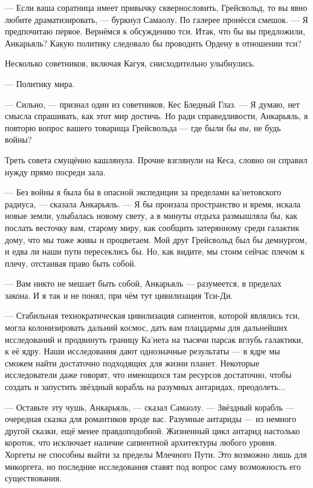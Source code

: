 --- Если ваша соратница имеет привычку сквернословить, Грейсвольд, то вы явно любите драматизировать, --- буркнул Самаолу.
По галерее пронёсся смешок.
--- Я предпочитаю первое.
Вернёмся к обсуждению тси.
Итак, что бы вы предложили, Анкарьяль?
Какую политику следовало бы проводить Ордену в отношении тси?

Несколько советников, включая Кагуя, снисходительно улыбнулись.

--- Политику мира.

--- Сильно, --- признал один из советников, Кес Бледный Глаз.
--- Я думаю, нет смысла спрашивать, как этот мир достичь.
Но ради справедливости, Анкарьяль, я повторю вопрос вашего товарища Грейсвольда --- где были бы \emph{вы}, не будь войны?

Треть совета смущённо кашлянула.
Прочие взглянули на Кеса, словно он справил нужду прямо посреди зала.

--- Без войны я была бы в опасной экспедиции за пределами ка'нетовского радиуса, --- сказала Анкарьяль.
--- Я бы пронзала пространство и время, искала новые земли, улыбалась новому свету, а в минуты отдыха размышляла бы, как послать весточку вам, старому миру, как сообщить затерянному среди галактик дому, что мы тоже живы и процветаем.
Мой друг Грейсвольд был бы демиургом, и едва ли наши пути пересеклись бы.
Но, как видите, мы стоим сейчас плечом к плечу, отстаивая право быть собой.

--- Вам никто не мешает быть собой, Анкарьяль --- разумеется, в пределах закона.
И я так и не понял, при чём тут цивилизация Тси-Ди.

--- Стабильная технократическая цивилизация сапиентов, которой являлись тси, могла колонизировать дальний космос, дать вам плацдармы для дальнейших исследований и продвинуть границу Ка'нета на тысячи парсак вглубь галактики, к её ядру.
Наши исследования дают однозначные результаты --- в ядре мы сможем найти достаточно подходящих для жизни планет.
Некоторые исследователи даже говорят, что имеющихся там ресурсов достаточно, чтобы создать и запустить звёздный корабль на разумных антаридах, преодолеть...

--- Оставьте эту чушь, Анкарьяль, --- сказал Самаолу.
--- Звёздный корабль --- очередная сказка для романтиков вроде вас.
Разумные антариды --- из немного другой сказки, ещё менее правдоподобной.
Жизненный цикл антарид настолько короток, что исключает наличие сапиентной архитектуры любого уровня.
Хоргеты не способны выйти за пределы Млечного Пути.
Это возможно лишь для микоргета, но последние исследования ставят под вопрос саму возможность его существования.

